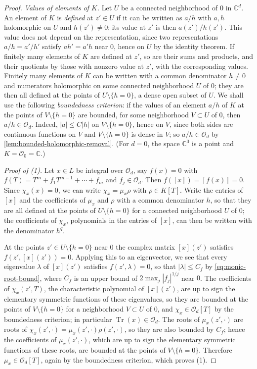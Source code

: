 \begin{proof}
\emph{Values of elements of $K$.} Let $U$ be a connected neighborhood of $0$ in $\mathbb C^d$. An element of $K$ is \emph{defined} at $z'\in U$ if it can be written as $a/h$ with $a,h$ holomorphic on $U$ and $h(z')\neq0$; its value at $z'$ is then $a(z')/h(z')$. This value does not depend on the representation, since two representations $a/h=a'/h'$ satisfy $ah'=a'h$ near $0$, hence on $U$ by the identity theorem. If finitely many elements of $K$ are defined at $z'$, so are their sums and products, and their quotients by those with nonzero value at $z'$, with the corresponding values. Finitely many elements of $K$ can be written with a common denominator $h\neq0$ and numerators holomorphic on some connected neighborhood $U$ of $0$; they are then all defined at the points of $U\setminus\{h=0\}$, a dense open subset of $U$. We shall use the following \emph{boundedness criterion}: if the values of an element $a/h$ of $K$ at the points of $V\setminus\{h=0\}$ are bounded, for some neighborhood $V\subset U$ of $0$, then $a/h\in\mathcal O_d$. Indeed, $|a|\leq C|h|$ on $V\setminus\{h=0\}$, hence on $V$, since both sides are continuous functions on $V$ and $V\setminus\{h=0\}$ is dense in $V$; so $a/h\in\mathcal O_d$ by \cref{lem:bounded-holomorphic-removal}. (For $d=0$, the space $\mathbb C^0$ is a point and $K=\mathcal O_0=\mathbb C$.)

\emph{Proof of {\upshape(1)}.} Let $x\in L$ be integral over $\mathcal O_d$, say $f(x)=0$ with $f(T)=T^m+f_1T^{m-1}+\cdots+f_m$ and $f_j\in\mathcal O_d$. Then $f([x])=[f(x)]=0$. Since $\chi_x(x)=0$, we can write $\chi_x=\mu_x\rho$ with $\rho\in K[T]$. Write the entries of $[x]$ and the coefficients of $\mu_x$ and $\rho$ with a common denominator $h$, so that they are all defined at the points of $U\setminus\{h=0\}$ for a connected neighborhood $U$ of $0$; the coefficients of $\chi_x$, polynomials in the entries of $[x]$, can then be written with the denominator $h^q$.

At the points $z'\in U\setminus\{h=0\}$ near $0$ the complex matrix $[x](z')$ satisfies $f(z',[x](z'))=0$. Applying this to an eigenvector, we see that every eigenvalue $\lambda$ of $[x](z')$ satisfies $f(z',\lambda)=0$, so that $|\lambda|\leq C_f$ by \eqref{eq:monic-root-bound}, where $C_f$ is an upper bound of $2\max_j|f_j|^{1/j}$ near $0$. The coefficients of $\chi_x(z',T)$, the characteristic polynomial of $[x](z')$, are up to sign the elementary symmetric functions of these eigenvalues, so they are bounded at the points of $V\setminus\{h=0\}$ for a neighborhood $V\subset U$ of $0$, and $\chi_x\in\mathcal O_d[T]$ by the boundedness criterion; in particular $\operatorname{Tr}(x)\in\mathcal O_d$. The roots of $\mu_x(z',\cdot)$ are roots of $\chi_x(z',\cdot)=\mu_x(z',\cdot)\rho(z',\cdot)$, so they are also bounded by $C_f$; hence the coefficients of $\mu_x(z',\cdot)$, which are up to sign the elementary symmetric functions of these roots, are bounded at the points of $V\setminus\{h=0\}$. Therefore $\mu_x\in\mathcal O_d[T]$, again by the boundedness criterion, which proves (1).


\end{proof}
